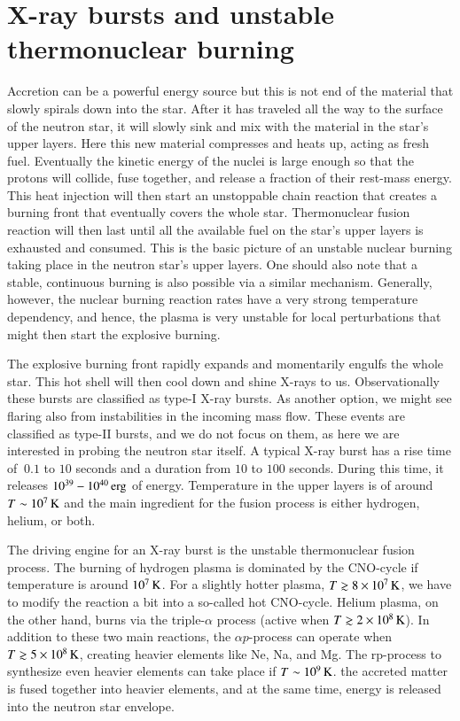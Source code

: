 \section{X-ray bursts and unstable thermonuclear burning}\label{sect:bursts}

Accretion can be a powerful energy source but this is not  end of the material that slowly spirals down into the star.
After it has traveled all the way to the surface of the neutron star, it will slowly sink and mix with the material in the star's upper layers.
Here this new material compresses and heats up, acting as fresh fuel.
Eventually the kinetic energy of the nuclei is large enough so that the protons will collide, fuse together, and release a fraction of their rest-mass energy.
This heat injection will then start an unstoppable chain reaction that creates a burning front that eventually covers the whole star.
Thermonuclear fusion reaction will then last until all the available fuel on the star's upper layers is exhausted and consumed.
This is the basic picture of an unstable nuclear burning taking place in the neutron star's upper layers.
One should also note that a stable, continuous burning is also possible via a similar mechanism. 
Generally, however, the nuclear burning reaction rates have a very strong temperature dependency, and hence, the plasma is very unstable for local perturbations that might then start the explosive burning.

The explosive burning front rapidly expands and momentarily engulfs the whole star.
This hot shell will then cool down and shine X-rays to us.
Observationally these bursts are classified as type-I X-ray bursts.\cite[see e.g.,][for a review]{Lewin93, SB10}
As another option, we might see flaring also from instabilities in the incoming mass flow. 
These events are classified as type-II bursts, and we do not focus on them, as here we are interested in probing the neutron star itself.
A typical X-ray burst has a rise time of $~0.1$ to $10$ seconds and a duration from $10$ to $100$ seconds.
During this time, it releases $10^{39} - 10^{40} \, \mathrm{erg}$ of energy.
Temperature in the upper layers is of around $T \sim 10^7 \, \mathrm{K}$ and the main ingredient for the fusion process is either hydrogen, helium, or both.

The driving engine for an X-ray burst is the unstable thermonuclear fusion process.\cite{Fujimoto81, Wallace81, Fisker08}
The burning of hydrogen plasma is dominated by the CNO-cycle if temperature is around $10^7 \, \mathrm{K}$.
For a slightly hotter plasma, $T \gtrsim 8 \times 10^{7} \, \mathrm{K}$, we have to modify the reaction a bit into a so-called hot CNO-cycle.\cite{FH65}
Helium plasma, on the other hand, burns via the triple-$\alpha$ process (active when $T \gtrsim 2 \times 10^{8} \, \mathrm{K}$).
In addition to these two main reactions, the $\alpha p$-process can operate when $T \gtrsim 5 \times 10^{8} \, \mathrm{K}$, creating heavier elements like Ne, Na, and Mg.
The rp-process to synthesize even heavier elements can take place if $T \sim 10^9 \, \mathrm{K}$.
 the accreted matter is fused together into heavier elements, and at the same time, energy is released into the neutron star envelope.

